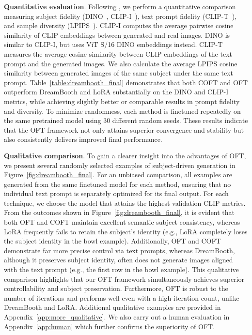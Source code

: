 \textbf{Quantitative evaluation}. Following \cite{ruiz2023dreambooth}, we perform a quantitative comparison measuring subject fidelity (DINO~\cite{caron2021emerging}, CLIP-I~\cite{radford2021learning}), text prompt fidelity (CLIP-T~\cite{radford2021learning}), and sample diversity (LPIPS~\cite{zhang2018unreasonable}). CLIP-I computes the average pairwise cosine similarity of CLIP embeddings between generated and real images. DINO is similar to CLIP-I, but uses ViT S/16 DINO embeddings instead. CLIP-T measures the average cosine similarity between CLIP embeddings of the text prompt and the generated images. We also calculate the average LPIPS cosine similarity between generated images of the same subject under the same text prompt. Table~\ref{table:dreambooth_final} demonstrates that both COFT and OFT outperform DreamBooth and LoRA substantially on the DINO and CLIP-I metrics, while achieving slightly better or comparable results in prompt fidelity and diversity. To minimize randomness, each method is finetuned repeatedly on the same pretrained model using 30 different random seeds. These results indicate that the OFT framework not only attains superior convergence and stability but also consistently delivers improved final performance.

\textbf{Qualitative comparison}. To gain a clearer insight into the advantages of OFT, we present several randomly selected examples of subject-driven generation in Figure~\ref{fig:dreambooth_final}. For an unbiased comparison, all examples are generated from the same finetuned model for each method, ensuring that no individual text prompt is separately optimized for its final output. For each technique, we choose the model that attains the highest validation CLIP metrics. From the outcomes shown in Figure~\ref{fig:dreambooth_final}, it is evident that both OFT and COFT maintain excellent semantic subject consistency, whereas LoRA frequently fails to retain the subject’s identity (e.g., LoRA completely loses the subject identity in the bowl example). Additionally, OFT and COFT demonstrate far more precise control via text prompts, whereas DreamBooth, although it preserves subject identity, often does not generate images aligned with the text prompt (e.g., the first row in the bowl example). This qualitative comparison highlights that our OFT framework simultaneously achieves superior controllability and subject preservation. Furthermore, OFT is robust to the number of iterations and performs well even with a high iteration count, unlike DreamBooth and LoRA. Additional qualitative examples are provided in Appendix~\ref{app:more_qualitative}. We also carry out a human evaluation in Appendix~\ref{app:human} which further confirms the superiority of OFT.

